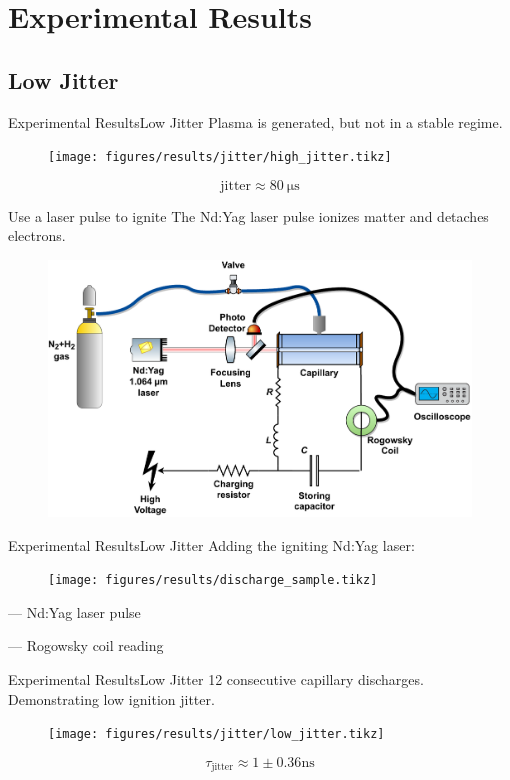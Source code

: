 \documentclass[dvipsnames]{beamer}
\begin{document}
\section{Experimental Results}
\subsection{Low Jitter}
\begin{frame}{Experimental Results}{Low Jitter}
Plasma is generated, but not in a stable regime.
\begin{figure}
 \texttt{[image: figures/results/jitter/high\_jitter.tikz]}
\end{figure}
$$\text{jitter}\approx \SI{80}{\us}$$
\end{frame}
\begin{frame}{Use a laser pulse to ignite}
    The Nd:Yag laser pulse ionizes matter and detaches electrons.
\begin{figure}
    \centering
    \includegraphics[width=\textwidth]{figures/results/jitter/Laser_based_ignition_scheme.pdf}
\end{figure}
\end{frame}
\begin{frame}{Experimental Results}{Low Jitter}
Adding the igniting Nd:Yag laser:
\begin{figure}
 \texttt{[image: figures/results/discharge\_sample.tikz]}
\end{figure}
 --- Nd:Yag laser pulse

 --- Rogowsky coil reading
\end{frame}
\begin{frame}{Experimental Results}{Low Jitter}
\small{12 consecutive capillary discharges. Demonstrating low ignition jitter.}
\begin{figure}
\texttt{[image: figures/results/jitter/low\_jitter.tikz]}
\end{figure}
$$\tau_\text{jitter}\approx 1\pm 0.36 \si{\ns}$$
\end{frame}
\end{document}
